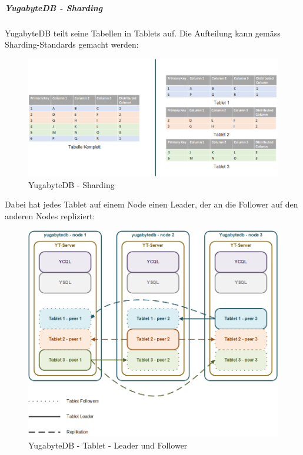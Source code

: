 \begin{flushleft}
    \subparagraph{YugabyteDB - Sharding}
    YugabyteDB teilt seine Tabellen in Tablets auf.
    Die Aufteilung kann gemäss Sharding-Standards gemacht werden:
    \begin{figure}[H]
        \centering
        \includegraphics[width=0.8\linewidth]{source/implementation/evaluation/postgresql_ha_solutions/yugabytedb/yugabytedb-sharding-tablets}
        \caption{YugabyteDB - Sharding}
        \label{fig:yugabytedb-sharding-tablets}
    \end{figure}
\end{flushleft}
\begin{flushleft}
    Dabei hat jedes Tablet auf einem Node einen Leader, der an die Follower auf den anderen Nodes repliziert:
    \begin{figure}[H]
        \centering
        \includegraphics[width=0.8\linewidth]{source/implementation/evaluation/postgresql_ha_solutions/yugabytedb/yugabytedb-tablet-masters}
        \caption{YugabyteDB - Tablet - Leader und Follower}
        \label{fig:yugabytedb-tablet-masters}
    \end{figure}
\end{flushleft}

